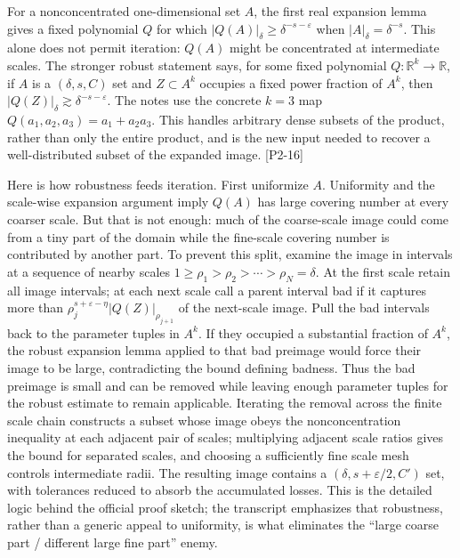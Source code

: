 For a nonconcentrated one-dimensional set \(A\), the first real expansion lemma gives a fixed polynomial \(Q\) for which \(|Q(A)|_\delta\ge\delta^{-s-\varepsilon}\) when \(|A|_\delta=\delta^{-s}\). This alone does not permit iteration: \(Q(A)\) might be concentrated at intermediate scales. The stronger robust statement says, for some fixed polynomial \(Q:\mathbb R^k\to\mathbb R\), if \(A\) is a \((\delta,s,C)\) set and \(Z\subset A^k\) occupies a fixed power fraction of \(A^k\), then \(|Q(Z)|_\delta\gtrsim\delta^{-s-\varepsilon}\). The notes use the concrete \(k=3\) map \(Q(a_1,a_2,a_3)=a_1+a_2a_3\). This handles arbitrary dense subsets of the product, rather than only the entire product, and is the new input needed to recover a well-distributed subset of the expanded image. {[}P2-16{]}

Here is how robustness feeds iteration. First uniformize \(A\). Uniformity and the scale-wise expansion argument imply \(Q(A)\) has large covering number at every coarser scale. But that is not enough: much of the coarse-scale image could come from a tiny part of the domain while the fine-scale covering number is contributed by another part. To prevent this split, examine the image in intervals at a sequence of nearby scales \(1\ge\rho_1>\rho_2>\cdots>\rho_N=\delta\). At the first scale retain all image intervals; at each next scale call a parent interval bad if it captures more than \(\rho_j^{s+\varepsilon-\eta}|Q(Z)|_{\rho_{j+1}}\) of the next-scale image. Pull the bad intervals back to the parameter tuples in \(A^k\). If they occupied a substantial fraction of \(A^k\), the robust expansion lemma applied to that bad preimage would force their image to be large, contradicting the bound defining badness. Thus the bad preimage is small and can be removed while leaving enough parameter tuples for the robust estimate to remain applicable. Iterating the removal across the finite scale chain constructs a subset whose image obeys the nonconcentration inequality at each adjacent pair of scales; multiplying adjacent scale ratios gives the bound for separated scales, and choosing a sufficiently fine scale mesh controls intermediate radii. The resulting image contains a \((\delta,s+\varepsilon/2,C')\) set, with tolerances reduced to absorb the accumulated losses. This is the detailed logic behind the official proof sketch; the transcript emphasizes that robustness, rather than a generic appeal to uniformity, is what eliminates the ``large coarse part / different large fine part'' enemy.

